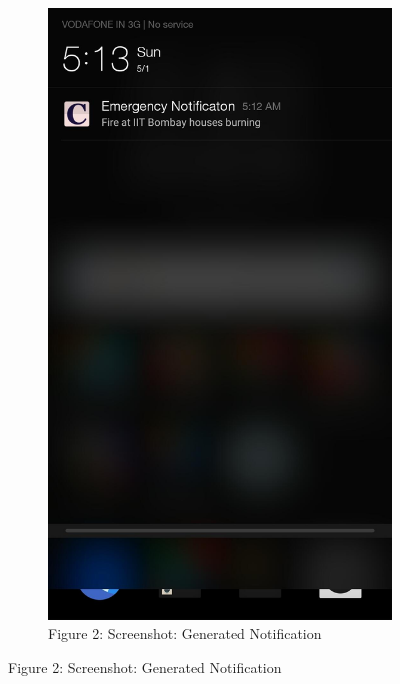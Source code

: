 \documentclass[english,12pt]{article}
\begin{document}
\begin{figure}[H]
\begin{subfigure}[t]{0.4\textwidth}
    \label{fig:1}
  \end{subfigure}
  \hspace{2mm}
  \begin{subfigure}[t]{0.4\textwidth}
    \includegraphics[width=\textwidth]{2}
    \caption*{\normalsize Figure 2: Screenshot: Generated Notification}
    \label{fig:2}
  \end{subfigure}
\end{figure}
\noindent\par
\end{document}
